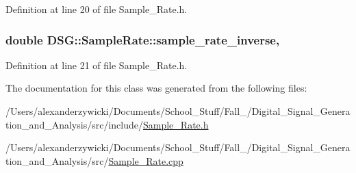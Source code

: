 Definition at line 20 of file Sample\+\_\+\+Rate.\+h.

\hypertarget{classDSG_1_1SampleRate_a17f5dfa529560272a0c9c917e3e2a41f}{
\subsubsection[{sample\+\_\+rate\+\_\+inverse}]{\setlength{\rightskip}{0pt plus 5cm}double D\+S\+G\+::\+Sample\+Rate\+::sample\+\_\+rate\+\_\+inverse\hspace{0.3cm}{\ttfamily [static]}, {\ttfamily [protected]}}}\label{classDSG_1_1SampleRate_a17f5dfa529560272a0c9c917e3e2a41f}


Definition at line 21 of file Sample\+\_\+\+Rate.\+h.



The documentation for this class was generated from the following files\+:\begin{DoxyCompactItemize}
\item 
/\+Users/alexanderzywicki/\+Documents/\+School\+\_\+\+Stuff/\+Fall\+\_/\+Digital\+\_\+\+Signal\+\_\+\+Generation\+\_\+and\+\_\+\+Analysis/src/include/\hyperlink{Sample__Rate_8h}{Sample\+\_\+\+Rate.\+h}\item 
/\+Users/alexanderzywicki/\+Documents/\+School\+\_\+\+Stuff/\+Fall\+\_/\+Digital\+\_\+\+Signal\+\_\+\+Generation\+\_\+and\+\_\+\+Analysis/src/\hyperlink{Sample__Rate_8cpp}{Sample\+\_\+\+Rate.\+cpp}\end{DoxyCompactItemize}
